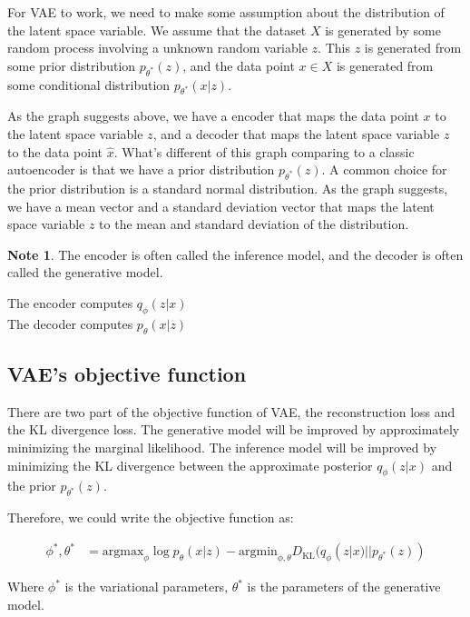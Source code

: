 \documentclass[11pt]{article}
\theoremstyle{definition}
\newtheorem{note}{Note}
\begin{document}
For VAE to work, we need to make some assumption about the distribution of the latent space variable. We assume that the dataset $X$ is generated by some random process involving a unknown random variable $z$. This $z$ is generated from some prior distribution $p_{\theta^*}(z)$, and the data point $x \in X$ is generated from some conditional distribution $p_{\theta^*}(x|z)$. 

As the graph suggests above, we have a encoder that maps the data point $x$ to the latent space variable $z$, and a decoder that maps the latent space variable $z$ to the data point $\hat{x}$. What's different of this graph comparing to a classic autoencoder is that we have a prior distribution $p_{\theta^*}(z)$. A common choice for the prior distribution is a standard normal distribution. As the graph suggests, we have a mean vector and a standard deviation vector that maps the latent space variable $z$ to the mean and standard deviation of the distribution.

\begin{note}
The encoder is often called the inference model, and the decoder is often called the generative model. 

\begin{center} The encoder computes $q_\phi(z|x)$\\The decoder computes $p_\theta(x|z)$ \end{center}
\end{note}

\subsection{VAE's objective function}

There are two part of the objective function of VAE, the reconstruction loss and the KL divergence loss. The generative model will be improved by approximately minimizing the marginal likelihood. The inference model will be improved by minimizing the KL divergence between the approximate posterior $q_\phi(z|x)$ and the prior $p_{\theta^*}(z)$.

Therefore, we could write the objective function as:


\begin{align}
\phi^*, \theta^* &= \text{argmax}_{\phi} \log p_\theta(x|z) - \text{argmin}_{\phi, \theta}D_\text{KL}(q_\phi(z|x)||p_{\theta^*}(z))
\end{align}

Where $\phi^*$ is the variational parameters, $\theta^*$ is the parameters of the generative model.
\end{document}
